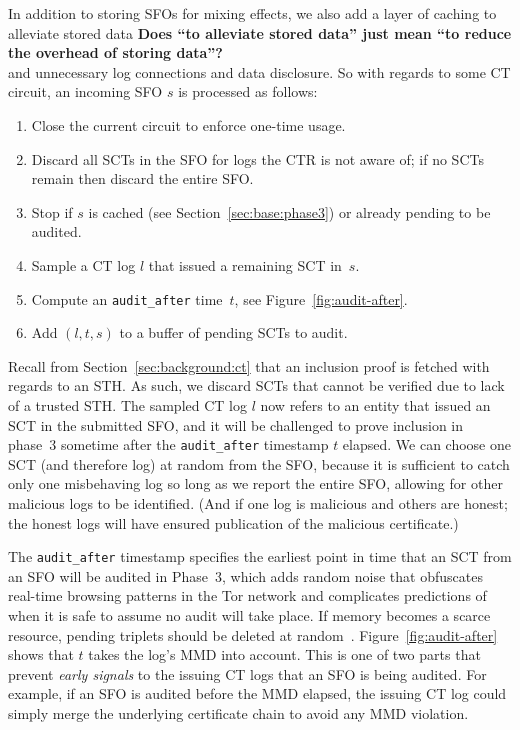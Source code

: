 In addition to storing SFOs for mixing effects, we also add a layer of caching
to alleviate stored data {\bf \color{red} Does ``to alleviate stored data'' just
mean ``to reduce the overhead of storing data''?}\\
and unnecessary log connections and data disclosure. So with
regards to some CT circuit, an incoming SFO $s$ is processed as follows:
\begin{enumerate}
    \item\label{enm:storage:close} Close the current circuit to enforce one-time
        usage.
    \item\label{enm:storage:unrecognized} Discard all SCTs in the SFO for logs the
        CTR is not aware of; if no SCTs remain then discard the entire SFO\@.
    \item\label{enm:storage:cached}
        Stop if $s$ is cached (see Section~\ref{sec:base:phase3}) or already
        pending to be audited.
    \item\label{enm:storage:fix-log} Sample a CT log $l$ that issued a
        remaining SCT in~$s$.
    \item\label{enm:storage:audit-after} Compute an \texttt{audit\_after}
		time~$t$, see Figure~\ref{fig:audit-after}.
    \item\label{enm:storage:store} Add $(l,t,s)$ to a buffer of pending SCTs to audit.
\end{enumerate}

Recall from Section~\ref{sec:background:ct} that an inclusion proof is fetched
with regards to an STH\@.  As such, we discard SCTs that cannot be verified due
to lack of a trusted STH\@.  The sampled CT log $l$ now refers to an entity that
issued an SCT in the submitted SFO, and it will be challenged to prove inclusion
in phase~3 sometime after the \texttt{audit\_after} timestamp $t$ elapsed. We
can choose one SCT (and therefore log) at random from the SFO, because it is
sufficient to catch only one misbehaving log so long as we report the entire
SFO, allowing for other malicious logs to be identified. (And if one log is
malicious and others are honest; the honest logs will have ensured publication
of the malicious certificate.)


The \texttt{audit\_after} timestamp specifies the earliest point in time that an
SCT from an SFO will be audited in Phase~3, which adds random noise that
obfuscates real-time browsing patterns in the Tor network and complicates
predictions of when it is safe to assume no audit will take place.  If memory
becomes a scarce resource, pending triplets should be deleted at
random~\cite{nordberg}. Figure~\ref{fig:audit-after} shows that $t$ takes the
log's MMD into account.  This is one of two parts that prevent \emph{early
signals} to the issuing CT logs that an SFO is being audited.  For example, if
an SFO is audited before the MMD elapsed, the issuing CT log could simply merge
the underlying certificate chain to avoid any MMD violation.

